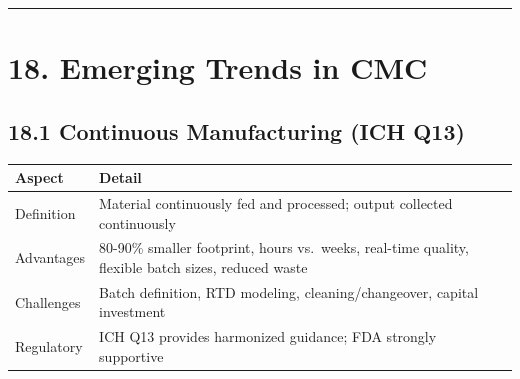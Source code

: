 \documentclass[
  11pt,
  a4paper,
]{report}
\begin{document}
\begin{center}\rule{0.5\linewidth}{0.5pt}\end{center}

\hypertarget{emerging-trends-in-cmc}{%
\section{18. Emerging Trends in CMC}\label{emerging-trends-in-cmc}}

\hypertarget{continuous-manufacturing-ich-q13}{%
\subsection{18.1 Continuous Manufacturing (ICH
Q13)}\label{continuous-manufacturing-ich-q13}}

\begin{longtable}[]{@{}ll@{}}
\toprule
\begin{minipage}[b]{0.47\columnwidth}\raggedright
Aspect\strut
\end{minipage} & \begin{minipage}[b]{0.47\columnwidth}\raggedright
Detail\strut
\end{minipage}\tabularnewline
\midrule
\endhead
\begin{minipage}[t]{0.47\columnwidth}\raggedright
Definition\strut
\end{minipage} & \begin{minipage}[t]{0.47\columnwidth}\raggedright
Material continuously fed and processed; output collected
continuously\strut
\end{minipage}\tabularnewline
\begin{minipage}[t]{0.47\columnwidth}\raggedright
Advantages\strut
\end{minipage} & \begin{minipage}[t]{0.47\columnwidth}\raggedright
80-90\% smaller footprint, hours vs.~weeks, real-time quality, flexible
batch sizes, reduced waste\strut
\end{minipage}\tabularnewline
\begin{minipage}[t]{0.47\columnwidth}\raggedright
Challenges\strut
\end{minipage} & \begin{minipage}[t]{0.47\columnwidth}\raggedright
Batch definition, RTD modeling, cleaning/changeover, capital
investment\strut
\end{minipage}\tabularnewline
\begin{minipage}[t]{0.47\columnwidth}\raggedright
Regulatory\strut
\end{minipage} & \begin{minipage}[t]{0.47\columnwidth}\raggedright
ICH Q13 provides harmonized guidance; FDA strongly supportive\strut
\end{minipage}\tabularnewline
\bottomrule
\end{longtable}
\end{document}
